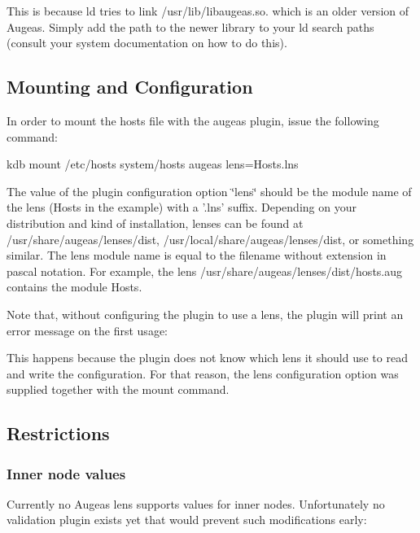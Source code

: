 This is because {\ttfamily ld} tries to link {\ttfamily /usr/lib/libaugeas.so.} which is an older version of Augeas. Simply add the path to the newer library to your ld search paths (consult your system documentation on how to do this).

\subsection*{Mounting and Configuration}

In order to mount the hosts file with the augeas plugin, issue the following command\+: \begin{DoxyVerb}kdb mount /etc/hosts system/hosts augeas lens=Hosts.lns
\end{DoxyVerb}


The value of the plugin configuration option \char`\"{}lens\char`\"{} should be the module name of the lens (Hosts in the example) with a '.lns' suffix. Depending on your distribution and kind of installation, lenses can be found at {\ttfamily /usr/share/augeas/lenses/dist}, {\ttfamily /usr/local/share/augeas/lenses/dist}, or something similar. The lens module name is equal to the filename without extension in pascal notation. For example, the lens {\ttfamily /usr/share/augeas/lenses/dist/hosts.aug} contains the module Hosts.

Note that, without configuring the plugin to use a lens, the plugin will print an error message on the first usage\+: 


This happens because the plugin does not know which lens it should use to read and write the configuration. For that reason, the lens configuration option was supplied together with the mount command.

\subsection*{Restrictions}

\subsubsection*{Inner node values}

Currently no Augeas lens supports values for inner nodes. Unfortunately no validation plugin exists yet that would prevent such modifications early\+: 


